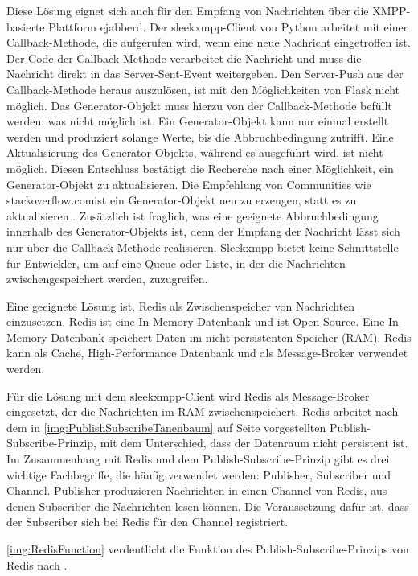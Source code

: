 \documentclass[a4paper,titlepage,halfparskip,12pt]{scrreprt}
\begin{document}
\begin{onehalfspacing}
Diese Lösung eignet sich auch für den Empfang von Nachrichten über die \acs{XMPP}-basierte Plattform ejabberd. Der sleekxmpp-Client von Python arbeitet mit einer Callback-Methode, die aufgerufen wird, wenn eine neue Nachricht eingetroffen ist. Der Code der Callback-Methode verarbeitet die Nachricht und muss die Nachricht direkt in das Server-Sent-Event weitergeben. Den Server-Push aus der Callback-Methode heraus auszulösen, ist mit den Möglichkeiten von Flask nicht möglich. Das Generator-Objekt muss hierzu von der Callback-Methode befüllt werden, was nicht möglich ist. Ein Generator-Objekt kann nur einmal erstellt werden und produziert solange Werte, bis die Abbruchbedingung zutrifft. Eine Aktualisierung des Generator-Objekts, während es ausgeführt wird, ist nicht möglich. Diesen Entschluss bestätigt die Recherche nach einer Möglichkeit, ein Generator-Objekt zu aktualisieren. Die Empfehlung von Communities wie \glqq stackoverflow.com\grqq ist ein Generator-Objekt neu zu erzeugen, statt es zu aktualisieren \cite{resetGeneratorObjectPython}. Zusätzlich ist fraglich, was eine geeignete Abbruchbedingung innerhalb des Generator-Objekts ist, denn der Empfang der Nachricht lässt sich nur über die Callback-Methode realisieren. Sleekxmpp bietet keine Schnittstelle für Entwickler, um auf eine Queue oder Liste, in der die Nachrichten zwischengespeichert werden, zuzugreifen.

Eine geeignete Lösung ist, Redis als Zwischenspeicher von Nachrichten einzusetzen. Redis ist eine In-Memory Datenbank und ist Open-Source. Eine In-Memory Datenbank speichert Daten im nicht persistenten Speicher (\acs{RAM}). Redis kann als Cache, High-Performance Datenbank und als Message-Broker verwendet werden.\cite{redisDocumentation}

Für die Lösung mit dem sleekxmpp-Client wird Redis als Message-Broker eingesetzt, der die Nachrichten im \acs{RAM} zwischenspeichert. Redis arbeitet nach dem in \autoref{img:PublishSubscribeTanenbaum} auf Seite \pageref{img:PublishSubscribeTanenbaum} vorgestellten Publish-Subscribe-Prinzip, mit dem Unterschied, dass der Datenraum nicht persistent ist. Im Zusammenhang mit Redis und dem Publish-Subscribe-Prinzip gibt es drei wichtige Fachbegriffe, die häufig verwendet werden: Publisher, Subscriber und Channel. Publisher produzieren Nachrichten in einen Channel von Redis, aus denen Subscriber die Nachrichten lesen können. Die Voraussetzung dafür ist, dass der Subscriber sich bei Redis für den Channel registriert.

\autoref{img:RedisFunction} verdeutlicht die Funktion des Publish-Subscribe-Prinzips von Redis nach \cite{redisDocumentation}.


\end{onehalfspacing}
\end{document}
